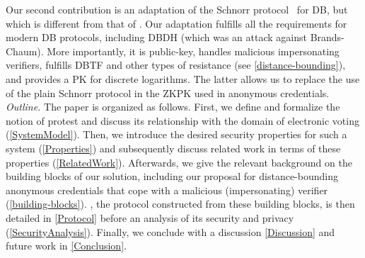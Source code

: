 Our second contribution is an adaptation of the Schnorr protocol~\cite{Schnorr} for \ac{DB}, but which is different from that of \textcite{distance-bounding}.
Our adaptation fulfills all the requirements for modern \ac{DB} protocols, including \ac{DBDH} (which was an attack against Brands-Chaum).
More importantly, it is public-key, handles malicious impersonating verifiers, fulfills \ac{DBTF} and other types of resistance (see \cref{distance-bounding}), and provides a \ac{PK} for discrete logarithms.
The latter allows us to replace the use of the plain Schnorr protocol in the \ac{ZKPK} used in anonymous credentials.
\emph{Outline.} 
The paper is organized as follows. 
First, we define and formalize the notion of protest and discuss its relationship with the domain of electronic voting (\cref{SystemModel}).  
Then, we introduce the desired security properties for such a system (\cref{Properties}) and subsequently discuss related work in 
terms of these properties (\cref{RelatedWork}). 
Afterwards, we give the relevant background on the building blocks of our solution, including our proposal for distance-bounding anonymous credentials that cope with a malicious (impersonating) verifier (\cref{building-blocks}). 
\PRIVO, the protocol constructed from these building blocks, is then detailed in \cref{Protocol} before an analysis of its security and privacy (\cref{SecurityAnalysis}). 
Finally, we conclude with a discussion \cref{Discussion} and future work in \cref{Conclusion}.
